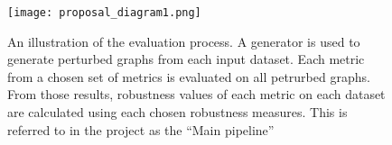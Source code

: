 \begin{figure}[p!]
    \centering
    \texttt{[image: proposal\_diagram1.png]}
    \caption{An illustration of the evaluation process.
    A generator is used to generate perturbed graphs from each input dataset.
    Each metric from a chosen set of metrics is evaluated on all petrurbed graphs.
    From those results, robustness values of each metric on each dataset are calculated using each chosen robustness measures.
    This is referred to in the project as the ``Main pipeline''}
    \label{fig:overview_prop_diagram}
\end{figure}
